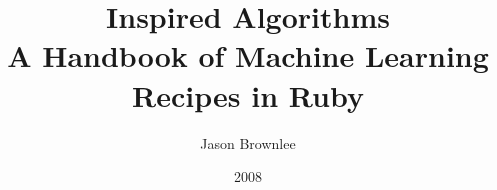 \lstset{style=colorruby}


% 
% 







%
%

\newcommand{\blanknonumber}{\newpage\thispagestyle{empty}}



% 
\setcounter{tocdepth}{1}


%
%
\makeatletter
\def\thickhrulefill{\leavevmode \leaders \hrule height 1pt\hfill \kern \z@}
\renewcommand{\maketitle}{\begin{titlepage}%
    \let\footnotesize\small
    \let\footnoterule\relax
    \parindent \z@
    \reset@font
    \null
    \vskip 10\p@
    \hbox{\mbox{\hspace{3em}}%
      \vrule depth 0.6\textheight%
      \mbox{\hspace{2em}}
      \vbox{
        \vskip 40\p@
        \begin{flushleft}
          \Large \@author \par
        \end{flushleft}
        \vskip 70\p@
        \begin{flushleft}
          \Huge \bfseries \@title \par
        \end{flushleft}
        \vfil
        }}
    \null
  \end{titlepage}%
  \setcounter{footnote}{0}%
}
\makeatother
\author{Jason Brownlee}
\title{Inspired Algorithms\\ {\large A Handbook of Machine Learning Recipes in Ruby}}
\date{2008}